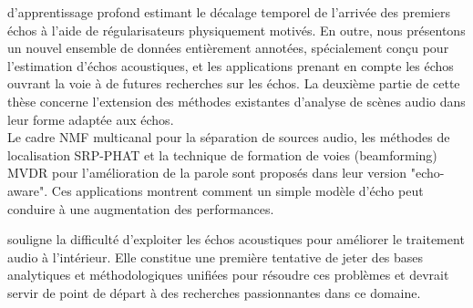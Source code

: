     d'apprentissage profond estimant le décalage temporel de l'arrivée des premiers échos à l'aide de régularisateurs physiquement motivés.
    En outre, nous présentons un nouvel ensemble de données entièrement annotées, spécialement conçu pour l'estimation d'échos acoustiques, et les applications prenant en compte les échos ouvrant la voie à de futures recherches sur les échos.    La deuxième partie de cette thèse concerne l'extension des méthodes existantes d'analyse de scènes audio dans leur forme adaptée aux échos.
    \\Le cadre NMF multicanal pour la séparation de sources audio, les méthodes de localisation SRP-PHAT et la technique de formation de voies (beamforming) MVDR pour l'amélioration de la parole
    sont proposés dans leur version "echo-aware". Ces applications montrent comment un simple modèle d'écho peut conduire à une augmentation des performances.

     souligne la difficulté d'exploiter les échos acoustiques pour améliorer le traitement audio à l'intérieur.
    Elle constitue une première tentative de jeter des bases analytiques et méthodologiques unifiées pour résoudre ces problèmes et devrait servir de point de départ à des recherches passionnantes dans ce domaine.